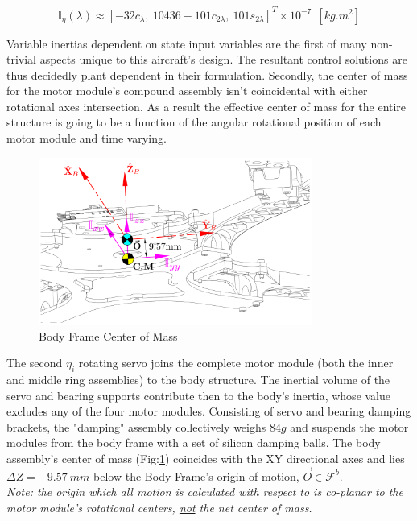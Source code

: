 \begin{equation}\label{eq:inertia.middle.vpa}
\mathbb{I}_\eta(\lambda)\approx[-32{c}_{\lambda},~ 10436-101{c}_{2\lambda},~ 101{s}_{2\lambda}]^T\times10^{-7}~~[kg.m^2]
\end{equation}
\par
Variable inertias dependent on state input variables are the first of many non-trivial aspects unique to this aircraft's design. The resultant control solutions are thus decidedly plant dependent in their formulation. Secondly, the center of mass for the motor module's compound assembly isn't coincidental with either rotational axes intersection. As a result the effective center of mass for the entire structure is going to be a function of the angular rotational position of each motor module and time varying.
\par
\begin{figure}[htbp]
\centering
\includegraphics[width=0.8\textwidth]{figs/inertia-center}
\caption{Body Frame Center of Mass}
\label{fig:inertia-center}
\end{figure}
The second $\eta_i$ rotating servo joins the complete motor module (both the inner and middle ring assemblies) to the body structure. The inertial volume of the servo and bearing supports contribute then to the body's inertia, whose value excludes any of the four motor modules. Consisting of servo and bearing damping brackets, the "damping" assembly collectively weighs $84g$ and suspends the motor modules from the body frame with a set of silicon damping balls. The body assembly's center of mass (Fig:\ref{fig:inertia-center}) coincides with the XY directional axes and lies $\Delta Z=-9.57~mm$ below the Body Frame's origin of motion, $\vec{O}\in\mathcal{F}^b$.
\\
\emph{\color{Gray}Note: the origin which all motion is calculated with respect to is co-planar to the motor module's rotational centers, \underline{not} the net center of mass.}
